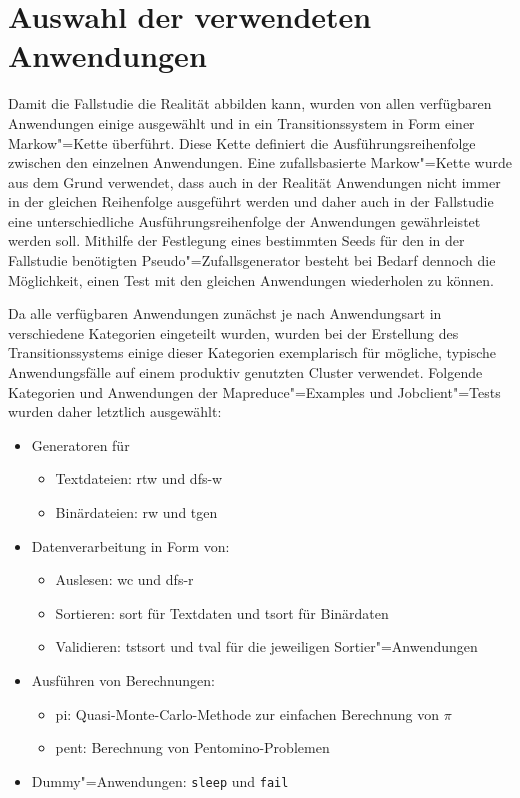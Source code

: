 \section{Auswahl der verwendeten Anwendungen}\label{sec:appSelection}

Damit die Fallstudie die Realität abbilden kann, wurden von allen verfügbaren Anwendungen einige ausgewählt und in ein Transitionssystem in Form einer Markow"=Kette überführt. Diese Kette definiert die Ausführungsreihenfolge zwischen den einzelnen Anwendungen. Eine zufallsbasierte Markow"=Kette wurde aus dem Grund verwendet, dass auch in der Realität Anwendungen nicht immer in der gleichen Reihenfolge ausgeführt werden und daher auch in der Fallstudie eine unterschiedliche Ausführungsreihenfolge der Anwendungen gewährleistet werden soll. Mithilfe der Festlegung eines bestimmten Seeds für den in der Fallstudie benötigten Pseudo"=Zufallsgenerator besteht bei Bedarf dennoch die Möglichkeit, einen Test mit den gleichen Anwendungen wiederholen zu können.

Da alle verfügbaren Anwendungen zunächst je nach Anwendungsart in verschiedene Kategorien eingeteilt wurden, wurden bei der Erstellung des Transitionssystems einige dieser Kategorien exemplarisch für mögliche, typische Anwendungsfälle auf einem produktiv genutzten Cluster verwendet. Folgende Kategorien und Anwendungen der Mapreduce"=Examples und Jobclient"=Tests wurden daher letztlich ausgewählt:

\begin{itemize}
    \item Generatoren für
    \begin{itemize}
        \item Textdateien: \ac{rtw} und \ac{dfs-w}
        \item Binärdateien: \ac{rw} und \ac{tgen}
    \end{itemize}

    \item Datenverarbeitung in Form von:
    \begin{itemize}
        \item Auslesen: \ac{wc} und \ac{dfs-r}
        \item Sortieren: \acl{sort} für Textdaten und \ac{tsort} für Binärdaten
        \item Validieren: \ac{tstsort} und \ac{tval} für die jeweiligen Sortier"=Anwendungen
    \end{itemize}

    \item Ausführen von Berechnungen:
    \begin{itemize}
        \item \acl{pi}: Quasi-Monte-Carlo-Methode zur einfachen Berechnung von $\pi$ 
        \item \ac{pent}: Berechnung von Pentomino-Problemen
    \end{itemize}

    \item Dummy"=Anwendungen: \texttt{sleep} und \texttt{fail}
\end{itemize}

